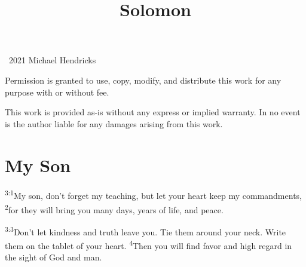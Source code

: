\documentclass[openany,12pt,english]{book}
\title{Solomon}
\author{}
\date{}
\newenvironment{para}{\par\pretolerance=100\tolerance=200\setlength{\emergencystretch}{0.6em}\relax}{\par}
\begin{document}
\maketitle

{
\thispagestyle{empty}
\vspace*{\fill}
\begin{changemargin}{.8in}{.8in}
\begin{center}
\textcopyright{}~2021 Michael Hendricks

\vspace{0.5\baselineskip}

Permission is granted to use, copy, modify, and distribute
this work for any purpose with or without fee.

\vspace{0.5\baselineskip}

This work is provided as-is without any express or implied
warranty. In no event is the author liable for any damages
arising from this work.
\end{center}
\end{changemargin}
}
\clearpage{}

\tableofcontents
\clearpage{}

\markboth{}{}


\section*{My Son}
\begin{para}
    \textsuperscript{3:1}\thinspace{}My son, don't for\-get my teach\-ing, but let your heart keep my commandments,
    \textsuperscript{2}\thinspace{}for they will bring you man\-y days, years of life, and peace.
\end{para}

\begin{para}
    \textsuperscript{3:3}\thinspace{}Don't let kind\-ness and truth leave you. Tie them a\-round your neck. Write them on the tab\-let of your heart.
    \textsuperscript{4}\thinspace{}Then you will find fa\-vor and high re\-gard in the sight of God and man.
\end{para}
\end{document}
